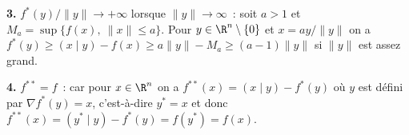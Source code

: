 {{{\bf 3.} $f^*(y)/\|y\|\to +\infty$ lorsque $\|y\|\to\infty$~:
soit $a>1$ et $M_a = \sup\{f(x),\ \|x\|\le a\}$.
Pour $y\in\R^n\setminus\{0\}$ et $x=ay/\|y\|$ on a
$f^*(y) \ge (x\mid y) - f(x) \ge a\|y\|-M_a\ge (a-1)\|y\|$ si $\|y\|$ est assez grand.

{\bf 4.} $f^{**} = f$~: car pour $x\in\R^n$ on a $f^{**}(x) = (x\mid y) - f^*(y)$ où $y$ est
défini par $\nabla f^*(y) = x$, c'est-à-dire $y^* = x$ et donc
$f^{**}(x) = (y^*\mid y) - f^*(y) = f(y^*) = f(x)$.
}
}
